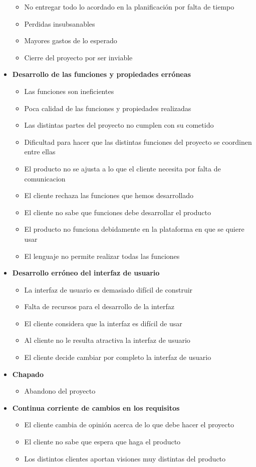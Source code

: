 \documentclass[spanish,a4paper,12pt]{report}	%
\begin{document}
\begin{itemize}
\begin{itemize}
		\item {No entregar todo lo acordado en la planificación por falta de tiempo}
		\item {Perdidas insubsanables}
		\item {Mayores gastos de lo esperado}
		\item {Cierre del proyecto por ser inviable}
	\end{itemize}
\item \textbf {Desarrollo de las funciones y propiedades erróneas}
	\begin{itemize}
		\item {Las funciones son ineficientes}
		\item {Poca calidad de las funciones y propiedades realizadas}
		\item {Las distintas partes del proyecto no cumplen con su cometido}
		\item {Dificultad para hacer que las distintas funciones del proyecto se coordinen entre ellas}
		\item {El producto no se ajusta a lo que el cliente necesita por falta de comunicacion}
		\item {El cliente rechaza las funciones que hemos desarrollado}
		\item {El cliente no sabe que funciones debe desarrollar el producto}
		\item {El producto no funciona debidamente en la plataforma en que se quiere usar}
		\item {El lenguaje no permite realizar todas las funciones}
	\end{itemize}
\item \textbf {Desarrollo erróneo del interfaz de usuario}
	\begin{itemize}
		\item {La interfaz de usuario es demasiado difícil de construir}
		\item {Falta de recursos para el desarrollo de la interfaz}
		\item {El cliente considera que la interfaz es difícil de usar}
		\item {Al cliente no le resulta atractiva la interfaz de usuario}
		\item {El cliente decide cambiar por completo la interfaz de usuario}
	\end{itemize}
\item \textbf {Chapado}
	\begin{itemize}
		\item {Abandono del proyecto}
	\end{itemize}
\item \textbf {Continua corriente de cambios en los requisitos}
	\begin{itemize}
		\item {El cliente cambia de opinión acerca de lo que debe hacer el proyecto}
		\item {El cliente no sabe que espera que haga el producto}
		\item {Los distintos clientes aportan visiones muy distintas del producto}


\end{itemize}
\end{itemize}
\end{document}
